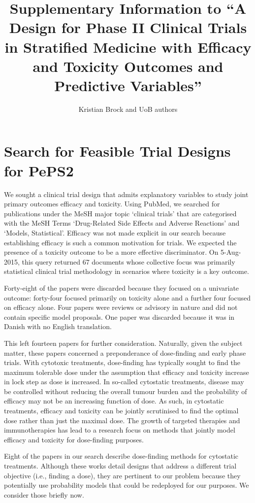 \documentclass{article}
\title{Supplementary Information to ``A Design for Phase II Clinical Trials in Stratified Medicine with Efficacy and Toxicity Outcomes and Predictive Variables''}
\author[1,2]{Kristian Brock and UoB authors}
\affil[1]{Cancer Research UK Clinical Trials Unit, Institute of Cancer and Genomic Sciences, University of Birmingham}
\affil[2]{Institute of Immunology and Immunotherapy, University of Birmingham}
\begin{document}
\maketitle





\section{Search for Feasible Trial Designs for PePS2}
We sought a clinical trial design that admits explanatory variables to study joint primary outcomes efficacy and toxicity.
Using PubMed, we searched for publications under the MeSH major topic `clinical trials' that are categorised with the MeSH Terms `Drug-Related Side Effects and Adverse Reactions' and `Models, Statistical'.
Efficacy was not made explicit in our search because establishing efficacy is such a common motivation for trials.
We expected the presence of a toxicity outcome to be a more effective discriminator.
On 5-Aug-2015, this query returned 67 documents whose collective focus was primarily statistical clinical trial methodology in scenarios where toxicity is a key outcome.

Forty-eight of the papers were discarded because they focused on a univariate outcome: forty-four focused primarily on toxicity alone and a further four focused on efficacy alone.
Four papers were reviews or advisory in nature and did not contain specific model proposals.
One paper was discarded because it was in Danish with no English translation.

This left fourteen papers for further consideration.
Naturally, given the subject matter, these papers concerned a preponderance of dose-finding and early phase trials.
With cytotoxic treatments, dose-finding has typically sought to find the maximum tolerable dose under the assumption that efficacy and toxicity increase in lock step as dose is increased.
In so-called cytostatic treatments, disease may be controlled without reducing the overall tumour burden and the probability of efficacy may not be an increasing function of dose.
As such, in cytostatic treatments, efficacy and toxicity can be jointly scrutinised to find the optimal dose rather than just the maximal dose.
The growth of targeted therapies and immunotherapies has lead to a research focus on methods that jointly model efficacy and toxicity for dose-finding purposes.

Eight of the papers in our search describe dose-finding methods for cytostatic treatments.
Although these works detail designs that address a different trial objective (i.e., finding a dose), they are pertinent to our problem because they potentially use probability models that could be redeployed for our purposes.
We consider those briefly now.
\end{document}
